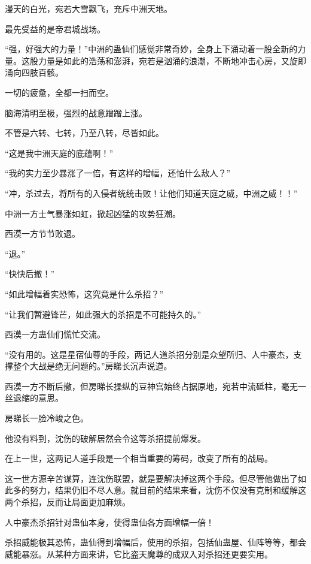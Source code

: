 
\begin{this_body}



漫天的白光，宛若大雪飘飞，充斥中洲天地。

最先受益的是帝君城战场。

“强，好强大的力量！”中洲的蛊仙们感觉非常奇妙，全身上下涌动着一股全新的力量。这股力量是如此的浩荡和澎湃，宛若是汹涌的浪潮，不断地冲击心房，又旋即涌向四肢百骸。

一切的疲惫，全都一扫而空。

脑海清明至极，强烈的战意蹭蹭上涨。

不管是六转、七转，乃至八转，尽皆如此。

“这是我中洲天庭的底蕴啊！”

“我的实力至少暴涨了一倍，有这样的增幅，还怕什么敌人？”

“冲，杀过去，将所有的入侵者统统击败！让他们知道天庭之威，中洲之威！！”

中洲一方士气暴涨如虹，掀起凶猛的攻势狂潮。

西漠一方节节败退。

“退。”

“快快后撤！”

“如此增幅着实恐怖，这究竟是什么杀招？”

“让我们暂避锋芒，如此强大的杀招是不可能持久的。”

西漠一方蛊仙们慌忙交流。

“没有用的。这是星宿仙尊的手段，两记人道杀招分别是众望所归、人中豪杰，支撑整个大战是绝无问题的。”房睇长沉声说道。

西漠一方不断后撤，但房睇长操纵的豆神宫始终占据原地，宛若中流砥柱，毫无一丝退缩的意思。

房睇长一脸冷峻之色。

他没有料到，沈伤的破解居然会令这等杀招提前爆发。

在上一世，这两记人道手段是一个相当重要的筹码，改变了所有的战局。

这一世方源辛苦谋算，连沈伤联盟，就是要解决掉这两个手段。但尽管他做出了如此多的努力，结果仍旧不尽人意。就目前的结果来看，沈伤不仅没有克制和缓解这两个杀招，反而让局面更加麻烦。

人中豪杰杀招针对蛊仙本身，使得蛊仙各方面增幅一倍！

杀招威能极其恐怖，蛊仙得到增幅后，使用的杀招，包括仙蛊屋、仙阵等等，都会威能暴涨。从某种方面来讲，它比盗天魔尊的成双入对杀招还更要实用。


\end{this_body}
